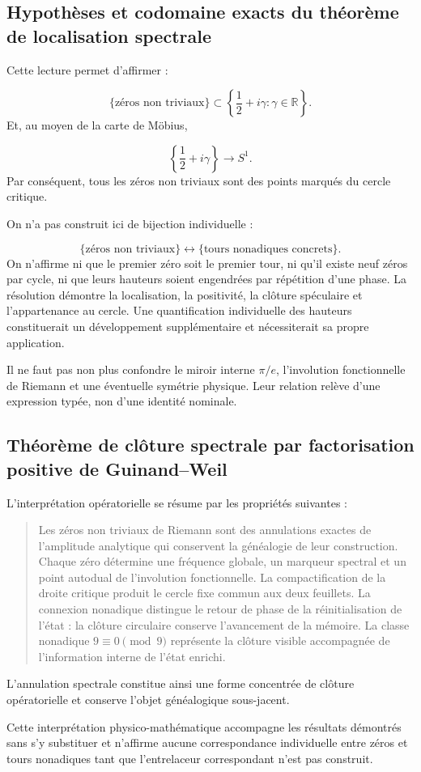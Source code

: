 \subsection{Hypothèses et codomaine exacts du théorème de localisation spectrale}
Cette lecture permet d'affirmer :\par
\[
\{\text{zéros non triviaux}\}
\subset
\left\{
\frac12+i\gamma:\gamma\in\mathbb R
\right\}.
\]
Et, au moyen de la carte de Möbius,\par
\[
\left\{
\frac12+i\gamma
\right\}
\longrightarrow
S^1.
\]
Par conséquent, tous les zéros non triviaux sont des points marqués du cercle critique.\par
On n'a pas construit ici de bijection individuelle :\par
\[
\{
\text{zéros non triviaux}
\}
\longleftrightarrow
\{
\text{tours nonadiques concrets}
\}.
\]
On n'affirme ni que le premier zéro soit le premier tour, ni qu'il existe neuf zéros par cycle, ni que leurs hauteurs soient engendrées par répétition d'une phase. La résolution démontre la localisation, la positivité, la clôture spéculaire et l'appartenance au cercle. Une quantification individuelle des hauteurs constituerait un développement supplémentaire et nécessiterait sa propre application.\par
Il ne faut pas non plus confondre le miroir interne \(\pi/e\), l'involution fonctionnelle de Riemann et une éventuelle symétrie physique. Leur relation relève d'une expression typée, non d'une identité nominale.\par
{}
\subsection{Théorème de clôture spectrale par factorisation positive de Guinand–Weil}
L'interprétation opératorielle se résume par les propriétés suivantes :\par
\begin{quote}
Les zéros non triviaux de Riemann sont des annulations exactes de l'amplitude analytique qui conservent la généalogie de leur construction. Chaque zéro détermine une fréquence globale, un marqueur spectral et un point autodual de l'involution fonctionnelle. La compactification de la droite critique produit le cercle fixe commun aux deux feuillets. La connexion nonadique distingue le retour de phase de la réinitialisation de l'état : la clôture circulaire conserve l'avancement de la mémoire. La classe nonadique \(9\equiv0\pmod 9\) représente la clôture visible accompagnée de l'information interne de l'état enrichi.\par
\end{quote}
L'annulation spectrale constitue ainsi une forme concentrée de clôture opératorielle et conserve l'objet généalogique sous-jacent.\par
Cette interprétation physico-mathématique accompagne les résultats démontrés sans s'y substituer et n'affirme aucune correspondance individuelle entre zéros et tours nonadiques tant que l'entrelaceur correspondant n'est pas construit.\par

